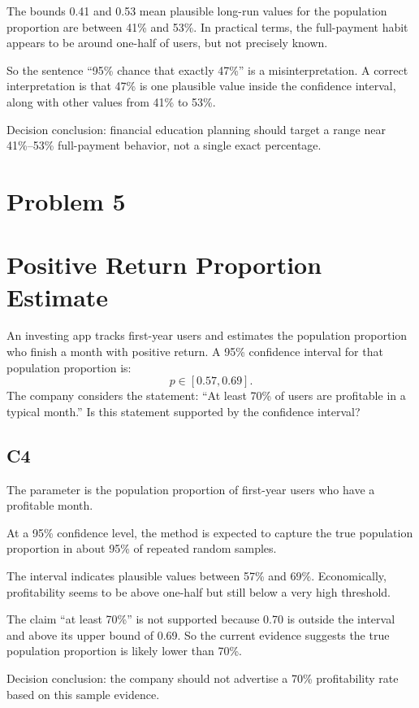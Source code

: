 \begin{ExamProblems}
		The bounds 0.41 and 0.53 mean plausible long-run values for the population proportion are between 41\% and 53\%.
		In practical terms, the full-payment habit appears to be around one-half of users, but not precisely known.

		So the sentence ``95\% chance that exactly 47\%'' is a misinterpretation.
		A correct interpretation is that 47\% is one plausible value inside the confidence interval, along with other values from 41\% to 53\%.

		Decision conclusion: financial education planning should target a range near 41\%--53\% full-payment behavior, not a single exact percentage.

		\newpage
		\item
		\section{Problem 5}
		\section{Positive Return Proportion Estimate}
		An investing app tracks first-year users and estimates the population proportion who finish a month with positive return.
		A 95\% confidence interval for that population proportion is:
		\[
		p \in [0.57, 0.69].
		\]
		The company considers the statement: ``At least 70\% of users are profitable in a typical month.''
		Is this statement supported by the confidence interval?

		\subsection*{C4}
		The parameter is the population proportion of first-year users who have a profitable month.

		At a 95\% confidence level, the method is expected to capture the true population proportion in about 95\% of repeated random samples.

		The interval indicates plausible values between 57\% and 69\%.
		Economically, profitability seems to be above one-half but still below a very high threshold.

		The claim ``at least 70\%'' is not supported because 0.70 is outside the interval and above its upper bound of 0.69.
		So the current evidence suggests the true population proportion is likely lower than 70\%.

		Decision conclusion: the company should not advertise a 70\% profitability rate based on this sample evidence.


\end{ExamProblems}
